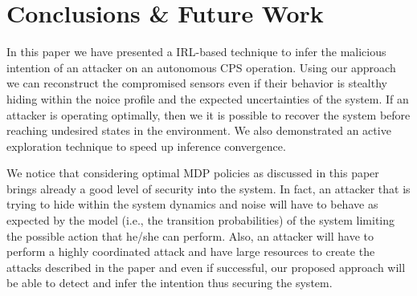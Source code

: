 \documentclass[letterpaper, 10 pt, conference]{ieeeconf}  %
\begin{document}
\section{Conclusions \& Future Work}\label{sec:conclusion}
In this paper we have presented a IRL-based technique to infer the malicious intention of an attacker on an autonomous CPS operation. Using our approach we can reconstruct the compromised sensors even if their behavior is stealthy hiding within the noice profile and the expected uncertainties of the system. If an attacker is operating optimally, then we it is possible to recover the system before reaching undesired states in the environment. We also demonstrated an active exploration technique to speed up inference convergence.

We notice that considering optimal MDP policies as discussed in this paper brings already a good level of security into the system. In fact, an attacker that is trying to hide within the system dynamics and noise will have to behave as expected by the model (i.e., the transition probabilities) of the system limiting the possible action that he/she can perform. Also, an attacker will have to perform a highly coordinated attack and have large resources to create the attacks described in the paper and even if successful, our proposed approach will be able to detect and infer the intention thus securing the system.
\end{document}
